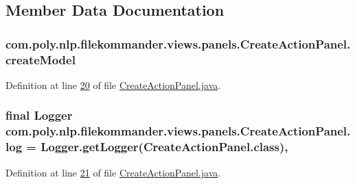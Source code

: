 \subsection{Member Data Documentation}
\hypertarget{classcom_1_1poly_1_1nlp_1_1filekommander_1_1views_1_1panels_1_1_create_action_panel_a7188ccd78e66b6a4fe3dd838fc1ae2f1}{
\subsubsection[{create\-Model}]{ com.\-poly.\-nlp.\-filekommander.\-views.\-panels.\-Create\-Action\-Panel.\-create\-Model\hspace{0.3cm}{\ttfamily [private]}}}\label{classcom_1_1poly_1_1nlp_1_1filekommander_1_1views_1_1panels_1_1_create_action_panel_a7188ccd78e66b6a4fe3dd838fc1ae2f1}


Definition at line \hyperlink{L20}{20} of file \hyperlink{}{Create\-Action\-Panel.\-java}.

\hypertarget{classcom_1_1poly_1_1nlp_1_1filekommander_1_1views_1_1panels_1_1_create_action_panel_af5dbfc85e283c5049b04b0bc4d066a97}{
\subsubsection[{log}]{\setlength{\rightskip}{0pt plus 5cm}final Logger com.\-poly.\-nlp.\-filekommander.\-views.\-panels.\-Create\-Action\-Panel.\-log = Logger.\-get\-Logger(Create\-Action\-Panel.\-class)\hspace{0.3cm}{\ttfamily [static]}, {\ttfamily [private]}}}\label{classcom_1_1poly_1_1nlp_1_1filekommander_1_1views_1_1panels_1_1_create_action_panel_af5dbfc85e283c5049b04b0bc4d066a97}


Definition at line \hyperlink{L21}{21} of file \hyperlink{}{Create\-Action\-Panel.\-java}.

